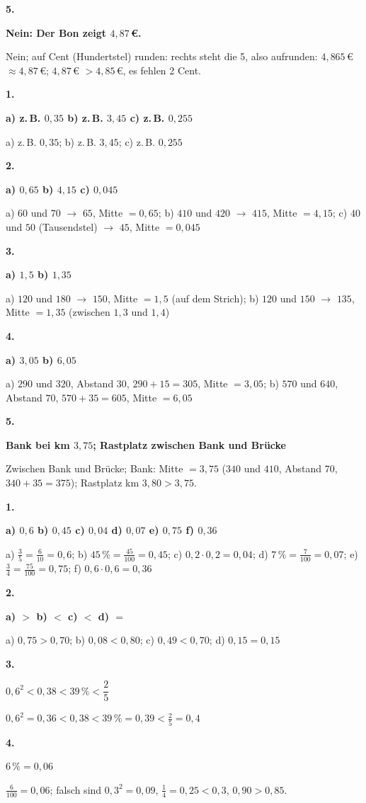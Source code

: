 \documentclass[11pt]{article}
\newcommand{\lsg}[3]{\par\noindent\begin{minipage}[t]{9mm}\textbf{#1}\end{minipage}%
  \begin{minipage}[t]{52mm}\raggedright\bfseries\boldmath #2\end{minipage}\hspace{3mm}%
  \begin{minipage}[t]{\dimexpr\linewidth-64mm\relax}\raggedright\small #3\end{minipage}\par\vspace{4pt}}
\begin{document}
\lsg{5.}{Nein: Der Bon zeigt $4{,}87$\,€.}{Nein; auf Cent (Hundertstel) runden: rechts steht die 5, also aufrunden: $4{,}865$\,€ $\approx 4{,}87$\,€; $4{,}87$\,€ $> 4{,}85$\,€, es fehlen 2 Cent.}
\par\Needspace{25mm}\vspace{6pt}\noindent\colorbox{black!12}{}\hspace{2mm}{\bfseries Dazwischen und genau in der Mitte}\par\vspace{4pt}
\lsg{1.}{a) z.\,B. $0{,}35$ \quad b) z.\,B. $3{,}45$ \quad c) z.\,B. $0{,}255$}{a) z.\,B. $0{,}35$; b) z.\,B. $3{,}45$; c) z.\,B. $0{,}255$}
\lsg{2.}{a) $0{,}65$ \quad b) $4{,}15$ \quad c) $0{,}045$}{a) $60$ und $70$ $\to$ $65$, Mitte $= 0{,}65$; b) $410$ und $420$ $\to$ $415$, Mitte $= 4{,}15$; c) $40$ und $50$ (Tausendstel) $\to$ $45$, Mitte $= 0{,}045$}
\lsg{3.}{a) $1{,}5$ \quad b) $1{,}35$}{a) $120$ und $180$ $\to$ $150$, Mitte $= 1{,}5$ (auf dem Strich); b) $120$ und $150$ $\to$ $135$, Mitte $= 1{,}35$ (zwischen $1{,}3$ und $1{,}4$)}
\lsg{4.}{a) $3{,}05$ \quad b) $6{,}05$}{a) $290$ und $320$, Abstand $30$, $290 + 15 = 305$, Mitte $= 3{,}05$; b) $570$ und $640$, Abstand $70$, $570 + 35 = 605$, Mitte $= 6{,}05$}
\lsg{5.}{Bank bei km $3{,}75$; Rastplatz zwischen Bank und Brücke}{Zwischen Bank und Brücke; Bank: Mitte $= 3{,}75$ ($340$ und $410$, Abstand $70$, $340 + 35 = 375$); Rastplatz km $3{,}80 > 3{,}75$.}
\par\Needspace{25mm}\vspace{6pt}\noindent\colorbox{black!12}{}\hspace{2mm}{\bfseries Bruch, Prozent, Quadrat: erst umwandeln}\par\vspace{4pt}
\lsg{1.}{a) $0{,}6$ \quad b) $0{,}45$ \quad c) $0{,}04$ \quad d) $0{,}07$ \quad e) $0{,}75$ \quad f) $0{,}36$}{a) $\frac{3}{5} = \frac{6}{10} = 0{,}6$; b) $45\,\% = \frac{45}{100} = 0{,}45$; c) $0{,}2 \cdot 0{,}2 = 0{,}04$; d) $7\,\% = \frac{7}{100} = 0{,}07$; e) $\frac{3}{4} = \frac{75}{100} = 0{,}75$; f) $0{,}6 \cdot 0{,}6 = 0{,}36$}
\lsg{2.}{a) $>$ \quad b) $<$ \quad c) $<$ \quad d) $=$}{a) $0{,}75 > 0{,}70$; b) $0{,}08 < 0{,}80$; c) $0{,}49 < 0{,}70$; d) $0{,}15 = 0{,}15$}
\lsg{3.}{$0{,}6^2 < 0{,}38 < 39\,\% < \dfrac{2}{5}$}{$0{,}6^2 = 0{,}36 < 0{,}38 < 39\,\% = 0{,}39 < \frac{2}{5} = 0{,}4$}
\lsg{4.}{$6\,\% = 0{,}06$}{$\frac{6}{100} = 0{,}06$; falsch sind $0{,}3^2 = 0{,}09$, $\frac{1}{4} = 0{,}25 < 0{,}3$, $0{,}90 > 0{,}85$.}
\end{document}
